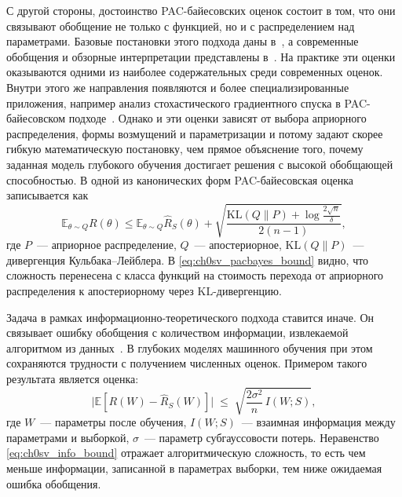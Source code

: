 С другой стороны, достоинство PAC-байесовских оценок состоит в том, что они связывают обобщение не только с функцией, но и с распределением над параметрами. Базовые постановки этого подхода даны в~\cite{mcallester1999pac,dziugaite2017computing}, а современные обобщения и обзорные интерпретации представлены в~\cite{zhou2018pacbayescompression,pacbayesinterpolating2023,pacbayes2025survey,hellstrom2025perspectives}.
На практике эти оценки оказываются одними из наиболее содержательных среди современных оценок.
Внутри этого же направления появляются и более специализированные приложения, например анализ стохастического градиентного спуска в PAC-байесовском подходе~\cite{pacbayes2019sgd,lottery2022pacbayes}.
Однако и эти оценки зависят от выбора априорного распределения, формы возмущений и параметризации и потому задают скорее гибкую математическую постановку, чем прямое объяснение того, почему заданная модель глубокого обучения достигает решения с высокой обобщающей способностью.
В одной из канонических форм PAC-байесовская оценка записывается как
\begin{equation}
\mathbb E_{\theta\sim Q}R(\theta)\le
\mathbb E_{\theta\sim Q}\hat R_S(\theta)+
\sqrt{\frac{\mathrm{KL}(Q\|P)+\log\frac{2\sqrt n}{\delta}}{2(n-1)}},
\label{eq:ch0sv_pacbayes_bound}
\end{equation}
где $P$~--- априорное распределение, $Q$~--- апостериорное, $\mathrm{KL}(Q\|P)$~--- дивергенция Кульбака--Лейблера. В \eqref{eq:ch0sv_pacbayes_bound} видно, что сложность перенесена с класса функций на стоимость перехода от априорного распределения к апостериорному через $\mathrm{KL}$-дивергенцию.

Задача в рамках информационно-теоретического подхода ставится иначе. Он связывает ошибку обобщения с количеством информации, извлекаемой алгоритмом из данных~\cite{xu2017information}.
В глубоких моделях машинного обучения при этом сохраняются трудности с получением численных оценок.
Примером такого результата является оценка:
\begin{equation}
\bigl|\mathbb E[R(W)-\hat R_S(W)]\bigr|
\;\le\;
\sqrt{\frac{2\sigma^2}{n}\,I(W;S)},
\label{eq:ch0sv_info_bound}
\end{equation}
где $W$~--- параметры после обучения, $I(W;S)$~--- взаимная информация между параметрами и выборкой, $\sigma$~--- параметр субгауссовости потерь.
Неравенство \eqref{eq:ch0sv_info_bound} отражает алгоритмическую сложность, то есть чем меньше информации, записанной в параметрах выборки, тем ниже ожидаемая ошибка обобщения.

